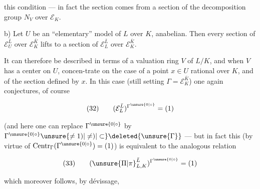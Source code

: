  this condition --- in fact the section comes from a section of the decomposition group $N_V$ over $\mathcal E_K$.

\noindent b) Let $U$ be an ``elementary'' model of $L$ over $K$, anabelian. Then every section of $\mathcal E_U^{\bar L}$ over $\mathcal E_K^{\bar K}$ lifts to a section of $\mathcal E_L^{\bar L}$ over $\mathcal E_K^{\bar K}$.

It can therefore be described in terms of a valuation ring $V$ of $L/K$, and when $V$ has a center on $U$,  concen-\newline trate on the case of a point $x\in U$ rational over $K$, and of the section defined by $x$. In this case (still setting $\Gamma=\mathcal E_K^{\bar K}$) one again conjectures, of course

\[
(32)\qquad (\mathcal E_L^{\bar L})^{\Gamma^{\unsure{0|\circ}}}=(1)
\]

(and here one can replace $\Gamma^{\unsure{0|\circ}}$ by $\Gamma^{\unsure{0|\circ}}\unsure{\ne1)|\ne)|\subset}\deleted{\unsure{\Gamma}}$
--- but in fact this (by virtue of $\operatorname{Centr}_\Gamma(\Gamma^{\unsure{0|\circ}})=(1)$) is equivalent to the analogous relation 

\[
(33)\qquad (\unsure{\Pi|\pi}_{L,K}^{\bar L})^{\Gamma^{\unsure{0|\circ}}}=(1)
\]

which moreover follows, by dévissage,

